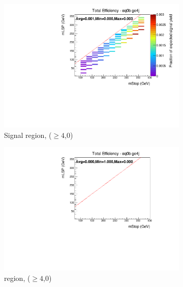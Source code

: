 \begin{figure}[ht!]
  \begin{subfigure}[b]{0.47\textwidth}
    \includegraphics[width=\textwidth, trim=0 0 0 24, clip=true]{Figs/sms/t2cc/v24/T2cc_v24_had_eff_maps_eq0b_ge4j_SITV.pdf}
    \caption{Signal region, ($\geq 4$,0)}
    \label{fig:t2cc_sig_eff_ge4j_0b}
  \end{subfigure}
  \begin{subfigure}[b]{0.47\textwidth}
    \includegraphics[width=\textwidth, trim=0 0 0 24, clip=true]{Figs/sms/t2cc/v24/T2cc_v24_muon_eff_maps_eq0b_ge4j_SITV.pdf}
    \caption{\mj region, ($\geq 4$,0)}
    \label{fig:t2cc_mu_eff_ge4j_0b}
  \end{subfigure} \\
  \begin{subfigure}[b]{0.47\textwidth}

\end{subfigure}
\end{figure}
